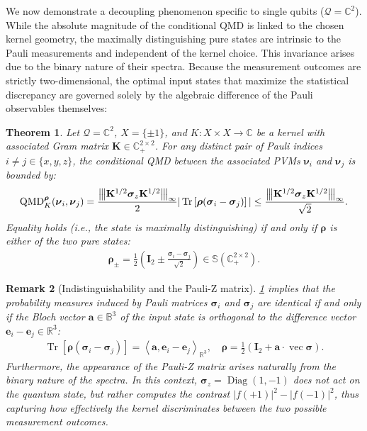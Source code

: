 \documentclass[noinfoline]{imsart}\setcounter{tocdepth}{2}
\renewcommand{\b}[1]{\mathbb{#1}} %
\newcommand{\m}[1]{\mathbf{#1}} %
\renewcommand{\c}[1]{\mathcal{#1}} %
\newcommand{\mb}[1]{\boldsymbol{#1}} %
\newcommand{\tr}[1]{\operatorname{Tr}\left[#1\right]}
\newcommand{\vertiii}[1]{{\left\vert\kern-0.25ex\left\vert\kern-0.25ex\left\vert #1 
    \right\vert\kern-0.25ex\right\vert\kern-0.25ex\right\vert}} %
\newcommand{\innpr}[2]{{\left\langle {#1},{#2}\right\rangle}} %
\newcommand{\QMD}{\operatorname{QMD}}
\newcommand{\Diag}{\operatorname{Diag}}
\renewcommand{\vec}{\operatorname{vec}}
\theoremstyle{plain}
\newtheorem{theorem}{Theorem}[section]
\newtheorem{remark}[theorem]{Remark}
\begin{document}
We now demonstrate a decoupling phenomenon specific to single qubits ($\c{Q} = \b{C}^{2}$). While the absolute magnitude of the conditional QMD is linked to the chosen kernel geometry, the maximally distinguishing pure states are intrinsic to the Pauli measurements and independent of the kernel choice. This invariance arises due to the binary nature of their spectra. Because the measurement outcomes are strictly two-dimensional, the optimal input states that maximize the statistical discrepancy are governed solely by the algebraic difference of the Pauli observables themselves:

\begin{theorem}\label{thm:pauli:QMD}
Let $\c{Q}= \b{C}^{2}$, $X = \{\pm 1 \}$, and $K:X \times X \to \b{C}$ be a kernel with associated Gram matrix $\m{K} \in \b{C}_{+}^{2 \times 2}$. For any distinct pair of Pauli indices $i \ne j \in \{x, y, z\}$, the conditional QMD between the associated PVMs $\mb{\nu}_{i}$ and $\mb{\nu}_{j}$ is bounded by:
\begin{align*}
    \QMD_{K}^{\mb{\rho}}(\mb{\nu}_{i}, \mb{\nu}_{j}) = \frac{\vertiii{\m{K}^{1/2} \mb{\sigma}_{z} \m{K}^{1/2}}_{\infty}}{2} |\tr{\mb{\rho} (\mb{\sigma}_{i} - \mb{\sigma}_{j})}| \le \frac{\vertiii{\m{K}^{1/2} \mb{\sigma}_{z} \m{K}^{1/2}}_{\infty}}{\sqrt{2}}.
\end{align*}
Equality holds (i.e., the state is maximally distinguishing) if and only if $\mb{\rho}$ is either of the two pure states:
\begin{align*}
    \mb{\rho}_{\pm} = \frac{1}{2}\left(\m{I}_{2} \pm \frac{\mb{\sigma}_{i} - \mb{\sigma}_{j}}{\sqrt{2}}\right)\in \b{S}(\b{C}_{+}^{2 \times 2}).
\end{align*}
\end{theorem}

\begin{remark}[Indistinguishability and the Pauli-Z matrix]
\cref{thm:pauli:QMD} implies that the probability measures induced by Pauli matrices $\mb{\sigma}_{i}$ and $\mb{\sigma}_{j}$ are identical if and only if the Bloch vector $\m{a} \in \b{B}^{3}$ of the input state is orthogonal to the difference vector $\m{e}_{i} - \m{e}_{j} \in \b{R}^{3}$:
\begin{align*}
    \tr{\mb{\rho} (\mb{\sigma}_{i} - \mb{\sigma}_{j})} = \innpr{\m{a}}{\m{e}_{i} - \m{e}_{j}}_{\b{R}^{3}}, \quad \mb{\rho} = \frac{1}{2} (\m{I}_{2} + \m{a} \cdot \vec{\mb{\sigma}}).
\end{align*}
Furthermore, the appearance of the Pauli-Z matrix arises naturally from the binary nature of the spectra. In this context, $\mb{\sigma}_{z} = \Diag(1, -1)$ does not act on the quantum state, but rather computes the contrast $|f(+1)|^{2} - |f(-1)|^{2}$, thus capturing how effectively the kernel discriminates between the two possible measurement outcomes.
\end{remark}
\end{document}
